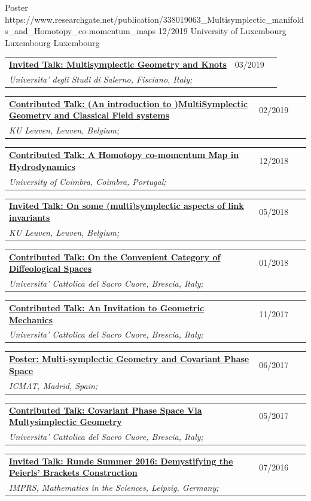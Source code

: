 \documentclass[a4paper]{article}
\newcommand{\longvoice}[8]{
    \begin{tabular}{p{0.83\linewidth} p{0.17\linewidth} }
        \textbf{\href{#3}{#2: #1}} & #4 
        \\ 
        \textit{#5, #6, #7;} & {\small\emph{#8}}
    \end{tabular}
    \vspace{.5em}
}
\begin{document}
        {Poster}
        {https://www.researchgate.net/publication/338019063_Multisymplectic_manifolds_and_Homotopy_co-momentum_maps}
        {12/2019}
        {University of Luxembourg}
        {Luxembourg}
        {Luxembourg}
        {}
    \longvoice{Multisymplectic Geometry and Knots}
        {Invited Talk}
        {https://www.researchgate.net/publication/331939491_Multisymplectic_aspects_of_link_invariants}
        {03/2019}
        {Universita' degli Studi di Salerno}
        {Fisciano}
        {Italy}
        {}
    \longvoice{(An introduction to )MultiSymplectic Geometry and Classical Field systems}
        {Contributed Talk}
        {https://www.dropbox.com/s/q68uv6hbbej8d09/1902-Talk-MultisymplecticFields.pdf?dl=0}
        {02/2019}
        {KU Leuven}
        {Leuven}
        {Belgium}
        {}
    \longvoice{A Homotopy co-momentum Map in Hydrodynamics}
        {Contributed Talk}
        {https://www.researchgate.net/publication/329572409_Homotopy_co-momentum_Map_in_Hydrodynamics}
        {12/2018}
        {University of Coimbra}
        {Coimbra}
        {Portugal}
        {}
    \longvoice{On some (multi)symplectic aspects of link invariants}
        {Invited Talk}
        {https://web.archive.org/web/20180424133109/https://wis.kuleuven.be/agenda/sem-geometry/academic-year-2017-2018/seminar_differential_geometry_Miti}
        {05/2018}
        {KU Leuven}
        {Leuven}
        {Belgium}
        {}
    \longvoice{On the Convenient Category of Diffeological Spaces}
        {Contributed Talk}
        {https://www.dropbox.com/s/thm6unntpduynh3/1801-Talk-ConvenientDiffeological.pdf?dl=0}
        {01/2018}
        {Universita' Cattolica del Sacro Cuore}
        {Brescia}
        {Italy}
        {}
    \longvoice{An Invitation to Geometric Mechanics}
        {Contributed Talk}
        {https://www.dropbox.com/s/k066hn2ubovhaop/1711-talk-invitationGeoMec.pdf?dl=0}
        {11/2017}
        {Universita' Cattolica del Sacro Cuore}
        {Brescia}
        {Italy}
        {}
    \longvoice{Multi-symplectic Geometry and Covariant Phase Space}
        {Poster}
        {https://www.researchgate.net/publication/319301416_Multi-symplectic_Geometry_and_Covariant_Phase_Space}
        {06/2017}
        {ICMAT}
        {Madrid}
        {Spain}
        {}
    \longvoice{Covariant Phase Space Via Multysimplectic Geometry}
        {Contributed Talk}
        {https://www.researchgate.net/publication/319301194_Notes_on_Covariant_Phase_Space_via_MultiSymplectic_Geometry}
        {05/2017}
        {Universita' Cattolica del Sacro Cuore}
        {Brescia}
        {Italy}
        {}
    \longvoice{Runde Summer 2016: Demystifying the Peierls' Brackets Construction}
        {Invited Talk}
        {https://www.dropbox.com/s/slk28t877e2nxtq/1607-Liepzig-RundeSummer.PDF?dl=0}
        {07/2016}
        {IMPRS, Mathematics in the Sciences}
        {Leipzig}
        {Germany}
        {}
\end{document}

